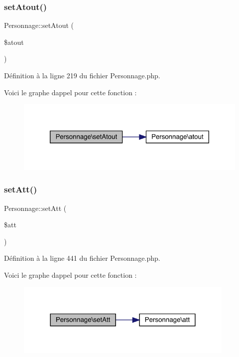 \subsubsection{\texorpdfstring{set\+Atout()}{setAtout()}}
{\footnotesize\ttfamily Personnage\+::set\+Atout (\begin{DoxyParamCaption}\item[{}]{\$atout }\end{DoxyParamCaption})}



Définition à la ligne 219 du fichier Personnage.\+php.

Voici le graphe d\textquotesingle{}appel pour cette fonction \+:\nopagebreak
\begin{figure}[H]
\begin{center}
\leavevmode
\includegraphics[width=320pt]{class_personnage_a3ba4e51f81e8d865675c1514332c0ac5_cgraph}
\end{center}
\end{figure}
\mbox{\label{class_personnage_a7b007c31486eff8234acabe91d6d1244}} 
\subsubsection{\texorpdfstring{set\+Att()}{setAtt()}}
{\footnotesize\ttfamily Personnage\+::set\+Att (\begin{DoxyParamCaption}\item[{}]{\$att }\end{DoxyParamCaption})}



Définition à la ligne 441 du fichier Personnage.\+php.

Voici le graphe d\textquotesingle{}appel pour cette fonction \+:\nopagebreak
\begin{figure}[H]
\begin{center}
\leavevmode
\includegraphics[width=298pt]{class_personnage_a7b007c31486eff8234acabe91d6d1244_cgraph}
\end{center}
\end{figure}
\mbox{\label{class_personnage_a5caf7c4c695a03b2d5ade3ec5963d749}} 

